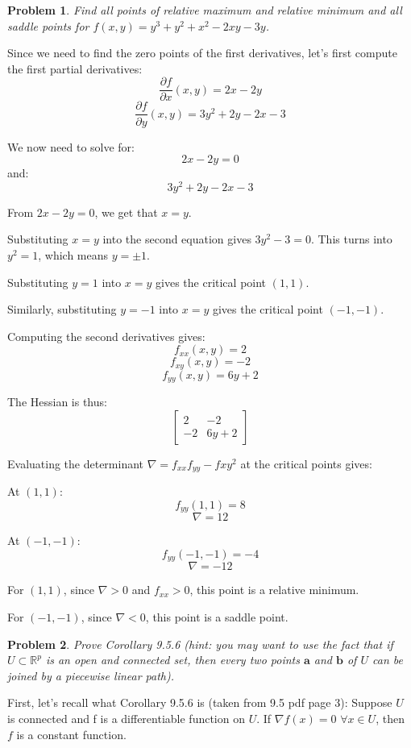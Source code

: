 \documentclass{article}
\newtheorem{xca}{Problem}
\newcommand{\R}{\mathbb{R}}
\newcommand{\sskip}{\newpage
}
\begin{document}
\sskip

\begin{xca} %
Find all points of relative maximum and relative minimum and all saddle points for $f(x,y)=y^3+y^2+x^2-2xy-3y$.
\end{xca}

Since we need to find the zero points of the first derivatives,
let's first compute the first partial derivatives:
\[\frac{\partial f}{\partial x}(x, y) = 2x - 2y\]
\[\frac{\partial f}{\partial y}(x, y) = 3y^2 + 2y - 2x - 3\]

We now need to solve for:
\[2x - 2y = 0\]
and:
\[3y^2 + 2y - 2x - 3\]

From $2x - 2y = 0$, we get that $x = y$.

Substituting $x = y$ into the second equation gives $3y^2 - 3 = 0$.
This turns into $y^2 = 1$, which means $y = \pm 1$.

Substituting $y = 1$ into $x = y$ gives the critical point $(1, 1)$.

Similarly, substituting $y = -1$ into $x = y$
gives the critical point $(-1, -1)$.

Computing the second derivatives gives:
\[f_{xx}(x, y) = 2\]
\[f_{xy}(x, y) = -2\]
\[f_{yy}(x, y) = 6y + 2\]

The Hessian is thus:
\[\begin{bmatrix}
    2 & -2 \\
    -2 & 6y + 2
\end{bmatrix}\]

Evaluating the determinant $\nabla = f_{xx} f_{yy} - f{xy}^2$ at the
critical points gives:

At $(1, 1)$:
\[f_{yy}(1, 1) = 8\]
\[\nabla = 12\]

At $(-1, -1)$:
\[f_{yy}(-1, -1) = -4\]
\[\nabla = -12\]

For $(1, 1)$, since $\nabla > 0$ and $f_{xx} > 0$,
this point is a relative minimum.

For $(-1, -1)$, since $\nabla < 0$, this point
is a saddle point.

\sskip

\begin{xca} %
Prove Corollary 9.5.6 (hint: you may want to use the fact that if $U\subset \R^p$ is an open and connected set, then 
every two points  $\mathbf{a}$ and $\mathbf{b}$ of $U$ can be joined by a piecewise linear path).
\end{xca}

First, let's recall what Corollary 9.5.6 is (taken from 9.5 pdf page 3):
Suppose $U$ is connected and f is a differentiable function on $U$. If $\nabla f(x) = 0$ $\forall x \in U$, then $f$ is a constant function.
\end{document}
